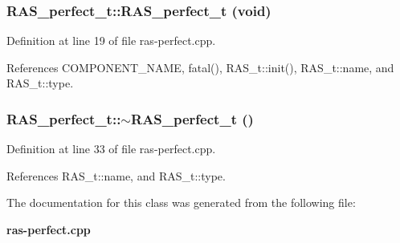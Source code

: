 \subsubsection[{RAS\_\-perfect\_\-t}]{\setlength{\rightskip}{0pt plus 5cm}RAS\_\-perfect\_\-t::RAS\_\-perfect\_\-t (void)\hspace{0.3cm}{\tt  [inline]}}\label{classRAS__perfect__t_dc20dc62084ec1021cb8319011f40581}




Definition at line 19 of file ras-perfect.cpp.

References COMPONENT\_\-NAME, fatal(), RAS\_\-t::init(), RAS\_\-t::name, and RAS\_\-t::type.
\subsubsection[{$\sim$RAS\_\-perfect\_\-t}]{\setlength{\rightskip}{0pt plus 5cm}RAS\_\-perfect\_\-t::$\sim$RAS\_\-perfect\_\-t ()\hspace{0.3cm}{\tt  [inline]}}\label{classRAS__perfect__t_bc738f1b9afb8d49683a15c2bc1c0f64}




Definition at line 33 of file ras-perfect.cpp.

References RAS\_\-t::name, and RAS\_\-t::type.

The documentation for this class was generated from the following file:\begin{CompactItemize}
\item 
{\bf ras-perfect.cpp}\end{CompactItemize}
